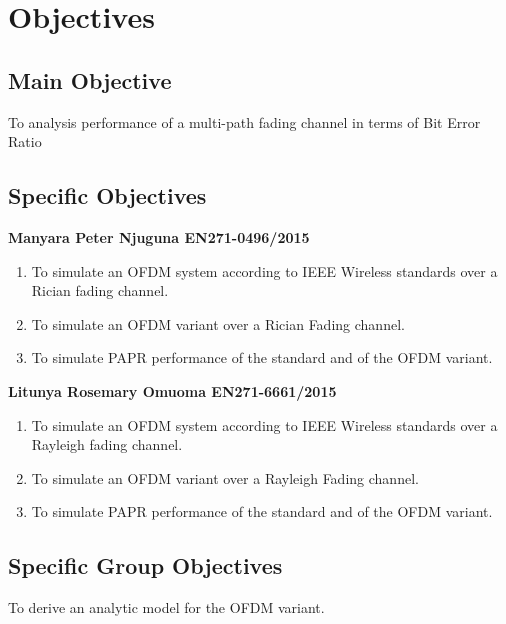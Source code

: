 
\section{Objectives}

\subsection{Main Objective}
To analysis performance of a multi-path fading channel in terms of Bit Error Ratio 

\subsection{Specific Objectives}


\textbf{Manyara Peter Njuguna EN271-0496/2015}
\begin{enumerate}[label=\roman*.]
	\item To simulate an \gls{OFDM} system according to IEEE Wireless standards over a Rician fading channel. 
	\item To simulate an \gls{OFDM} variant over a Rician Fading channel.
	\item To simulate \gls{PAPR} performance of the standard and of the \gls{OFDM} variant.
\end{enumerate}
\textbf{Litunya Rosemary Omuoma EN271-6661/2015}
\begin{enumerate}[label=\roman*.]
	\item To simulate an \gls{OFDM} system according to IEEE Wireless standards over a Rayleigh fading channel.

	\item To simulate an \gls{OFDM} variant over a Rayleigh Fading channel.
	\item To simulate \gls{PAPR} performance of the standard and of the \gls{OFDM} variant.
\end{enumerate}


\subsection{Specific Group Objectives}
To derive an analytic model for the \gls{OFDM} variant.

